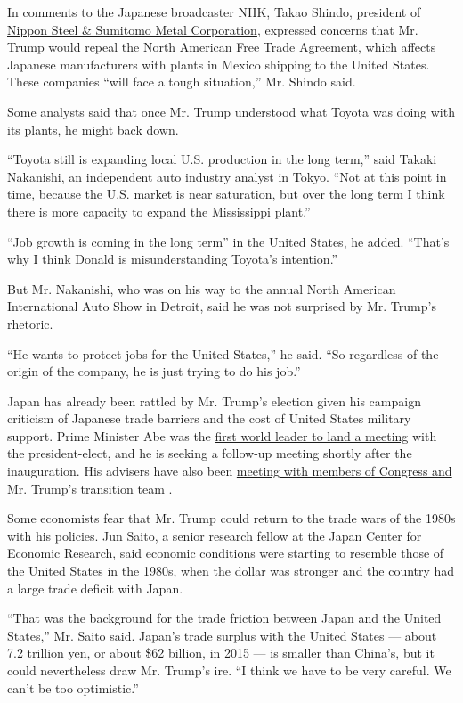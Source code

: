 In comments to the Japanese broadcaster NHK, Takao Shindo, president of
\href{http://www.nssmc.com/}{Nippon Steel \& Sumitomo Metal
Corporation}, expressed concerns that Mr. Trump would repeal the North
American Free Trade Agreement, which affects Japanese manufacturers with
plants in Mexico shipping to the United States. These companies ``will
face a tough situation,'' Mr. Shindo said.

Some analysts said that once Mr. Trump understood what Toyota was doing
with its plants, he might back down.

``Toyota still is expanding local U.S. production in the long term,''
said Takaki Nakanishi, an independent auto industry analyst in Tokyo.
``Not at this point in time, because the U.S. market is near saturation,
but over the long term I think there is more capacity to expand the
Mississippi plant.''

``Job growth is coming in the long term'' in the United States, he
added. ``That's why I think Donald is misunderstanding Toyota's
intention.''

But Mr. Nakanishi, who was on his way to the annual North American
International Auto Show in Detroit, said he was not surprised by Mr.
Trump's rhetoric.

``He wants to protect jobs for the United States,'' he said. ``So
regardless of the origin of the company, he is just trying to do his
job.''

Japan has already been rattled by Mr. Trump's election given his
campaign criticism of Japanese trade barriers and the cost of United
States military support. Prime Minister Abe was the
\href{https://www.nytimes.com/2016/11/17/world/asia/shinzo-abe-donald-trump.html}{first
world leader to land a meeting} with the president-elect, and he is
seeking a follow-up meeting shortly after the inauguration. His advisers
have also been
\href{https://www3.nhk.or.jp/nhkworld/en/news/20170106_13/}{meeting with
members of Congress and Mr. Trump's transition team} .

Some economists fear that Mr. Trump could return to the trade wars of
the 1980s with his policies. Jun Saito, a senior research fellow at the
Japan Center for Economic Research, said economic conditions were
starting to resemble those of the United States in the 1980s, when the
dollar was stronger and the country had a large trade deficit with
Japan.

``That was the background for the trade friction between Japan and the
United States,'' Mr. Saito said. Japan's trade surplus with the United
States --- about 7.2 trillion yen, or about \$62 billion, in 2015 --- is
smaller than China's, but it could nevertheless draw Mr. Trump's ire.
``I think we have to be very careful. We can't be too optimistic.''

